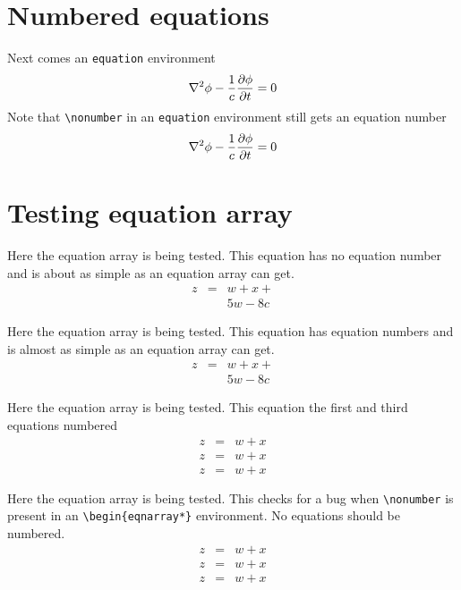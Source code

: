 \documentclass{article}
\begin{document}
\section{Numbered equations}
Next comes an \verb#equation# environment
\begin{equation}
\nabla^2 \phi -{1\over c} {\partial \phi\over \partial t}  = 0
\end{equation}
Note that \verb#\nonumber# in an \verb#equation# environment still gets
an equation number
\begin{equation}
\nabla^2 \phi -{1\over c} {\partial \phi\over \partial t}  = 0 \nonumber
\end{equation}

\section{Testing equation array}

Here the equation array is being tested.  This equation has no equation number
and is about as simple as an equation array can get.
\begin{eqnarray*}
z & = & w + x + \\
  &   & 5w - 8c 
\end{eqnarray*}

Here the equation array is being tested.  This equation has equation numbers
and is almost as simple as an equation array can get.
\begin{eqnarray}
z & = & w + x + \\
  &   & 5w - 8c 
\end{eqnarray}

Here the equation array is being tested.  This equation the first and third equations numbered
\begin{eqnarray}
z & = & w + x  \\
z & = & w + x \nonumber\\
z & = & w + x  
\end{eqnarray}

Here the equation array is being tested.  This checks for a bug when 
\verb#\nonumber# is present in an \verb#\begin{eqnarray*}# environment.  
No equations should be numbered.
\begin{eqnarray*}
z & = & w + x  \\
z & = & w + x \nonumber\\
z & = & w + x  
\end{eqnarray*}
\end{document}

